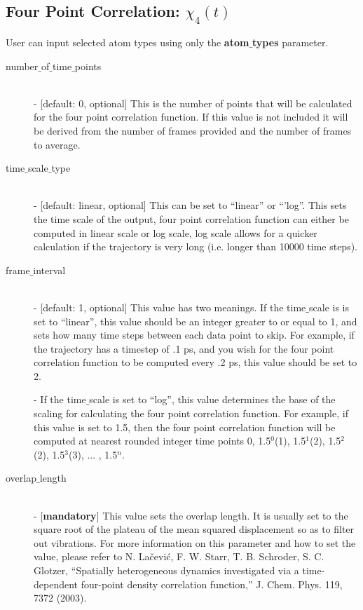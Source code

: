 \documentclass{article}
\begin{document}
\subsection{Four Point Correlation: $\chi_4(t)$} \label{sec::chi4_parm}
User can input selected atom types using only the \textbf{atom$\_$types} parameter.
\begin{description}	
	\item[number$\_$of$\_$time$\_$points]\hfill \\
	- [default: 0, optional] This is the number of points that will be calculated for the four point correlation function.  If this value is not included it will be derived from the number of frames provided and the number of frames to average.
	
	\item[time$\_$scale$\_$type] \hfill \\
	- [default: linear, optional] This can be set to ``linear'' or ``'log''.  This sets the time scale of the output, four point correlation function can either be computed in linear scale or log scale, log scale allows for a quicker calculation if the trajectory is very long (i.e. longer than 10000 time steps).
	
	\item[frame$\_$interval] \hfill \\
	- [default: 1, optional] This value has two meanings.  If the time$\_$scale is is set to ``linear'', this value should be an integer greater to or equal to 1, and sets how many time steps between each data point to skip.  For example, if the trajectory has a timestep of .1 ps, and you wish for the four point correlation function to be computed every .2 ps, this value should be set to 2. 
	
	- If the time$\_$scale is set to ``log'', this value determines the base of the scaling for calculating the four point correlation function.  For example, if this value is set to 1.5, then the four point correlation function will be computed at nearest rounded integer time points 0, 1.5$^0$(1), 1.5$^1$(2), 1.5$^2$(2), 1.5$^3$(3), ... , 1.5$^{n}$.
	
	\item[overlap$\_$length] \hfill \\
	- [\textbf{mandatory}] This value sets the overlap length. It is usually set to the square root of the plateau of the mean squared displacement so as to filter out vibrations. For more information on this parameter and how to set the value, please refer to N. Lačević, F. W. Starr, T. B. Schroder, S. C. Glotzer, ``Spatially heterogeneous dynamics investigated via a time-dependent four-point density correlation function,'' J. Chem. Phys. 119, 7372 (2003).
\end{description}
\end{document}
